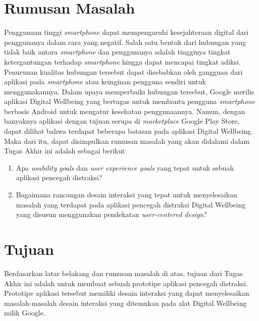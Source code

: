 \section{Rumusan Masalah}

Penggunaan tinggi \textit{smartphone} dapat mempengaruhi kesejahteraan digital dari penggunanya dalam cara yang negatif. Salah satu bentuk dari hubungan yang tidak baik antara \textit{smartphone} dan penggunanya adalah tingginya tingkat ketergantungan terhadap \textit{smartphone} hingga dapat mencapai tingkat adiksi. Penurunan kualitas hubungan tersebut dapat disebabkan oleh gangguan dari aplikasi pada \textit{smartphone} atau keinginan pengguna sendiri untuk menggunakannya. Dalam upaya memperbaiki hubungan tersebut, Google merilis aplikasi Digital Wellbeing yang bertugas untuk membantu pengguna \textit{smartphone} berbasis Android untuk mengatur kesehatan penggunaannya. Namun, dengan banyaknya aplikasi dengan tujuan serupa di \textit{marketplace} Google Play Store, dapat dilihat bahwa terdapat beberapa batasan pada aplikasi Digital Wellbeing. Maka dari itu, dapat disimpulkan rumusan masalah yang akan didalami dalam Tugas Akhir ini adalah sebagai berikut

\begin{enumerate}
  \item Apa \textit{usability goals} dan \textit{user experience goals} yang tepat untuk sebuah aplikasi pencegah distraksi?
  \item Bagaimana rancangan desain interaksi yang tepat untuk menyelesaikan masalah yang terdapat pada aplikasi pencegah distraksi Digital Wellbeing yang disusun menggunakan pendekatan \textit{user-centered design}?
\end{enumerate}

\section{Tujuan}

Berdasarkan latar belakang dan rumusan masalah di atas, tujuan dari Tugas Akhir ini adalah untuk membuat sebuah prototipe aplikasi pencegah distraksi. Prototipe aplikasi tersebut memiliki desain interaksi yang dapat menyelesaikan masalah-masalah desain interaksi yang ditemukan pada alat Digital Wellbeing milik Google.


